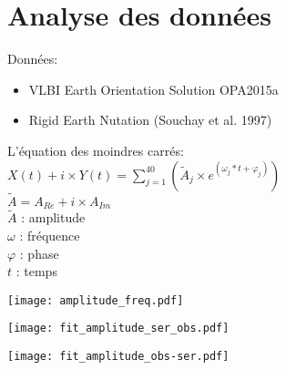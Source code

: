 \section{Analyse des données}

\begin{frame}
Données: \\
	\begin{itemize}
		\item VLBI Earth Orientation Solution OPA2015a	
		\item Rigid Earth Nutation (Souchay et al. 1997)
	\end{itemize}
	\vspace{0.5cm}
	L'équation des moindres carrés: \\
	$X(t) + i \times Y(t) = \sum\limits_{j=1}^{40} (\widetilde{A}_{j} \times e^{(\omega_{j}*t + \varphi_{j})})$ \\
	$\widetilde{A} = A_{Re} + i \times A_{Im}$ \\

	\vspace{0.5cm}
	$\widetilde{A}$ : amplitude \\
	$\omega$ : fréquence \\
	$\varphi$ : phase \\
	$t$ : temps
\end{frame}

\begin{frame}
	\begin{center}
		\texttt{[image: amplitude\_freq.pdf]}
	\end{center}
\end{frame}

\begin{frame}
	\begin{center}
		\texttt{[image: fit\_amplitude\_ser\_obs.pdf]}
	\end{center}
\end{frame}

\begin{frame}
	\begin{center}
		\texttt{[image: fit\_amplitude\_obs-ser.pdf]}
	\end{center}
\end{frame}